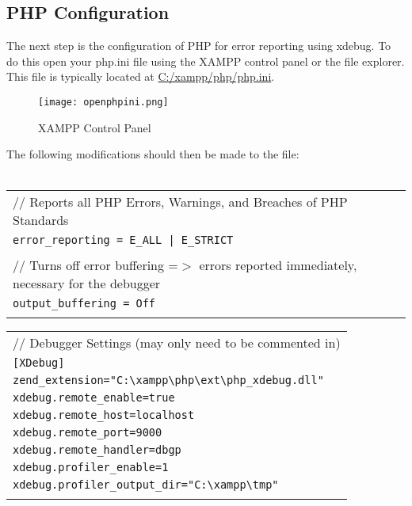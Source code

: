 \newpage
\subsection{PHP Configuration}
\label{subsec:phpconfig}

The next step is the configuration of PHP for error reporting using xdebug. To do this open your php.ini file using the XAMPP control panel or the file explorer. This file is typically located at \url{C:/xampp/php/php.ini}.\\

\begin{figure}[h] 
	\centering
	\texttt{[image: openphpini.png]}
	\caption{XAMPP Control Panel}
	\label{fig:xamppcontrolpanel}
\end{figure}

The following modifications should then be made to the file:\\
\\

\begin{tabular}{l}
	// Reports all PHP Errors, Warnings, and Breaches of PHP Standards\\
	\texttt{error\_reporting = E\_ALL | E\_STRICT}\\\\
	
	// Turns off error buffering =$>$ errors reported immediately, necessary for the debugger\\
	\texttt{output\_buffering = Off} \\\\
\end{tabular}

\begin{tabular}{l}
	// Debugger Settings (may only need to be commented in)\\
	\texttt{[XDebug]} \\
	\texttt{zend\_extension="C:\textbackslash xampp\textbackslash php\textbackslash ext\textbackslash php\_xdebug.dll"}\\
	\texttt{xdebug.remote\_enable=true}\\
	\texttt{xdebug.remote\_host=localhost}\\
	\texttt{xdebug.remote\_port=9000}\\
	\texttt{xdebug.remote\_handler=dbgp}\\
	\texttt{xdebug.profiler\_enable=1}\\
	\texttt{xdebug.profiler\_output\_dir="C:\textbackslash xampp\textbackslash tmp"}\\\\
\end{tabular}

